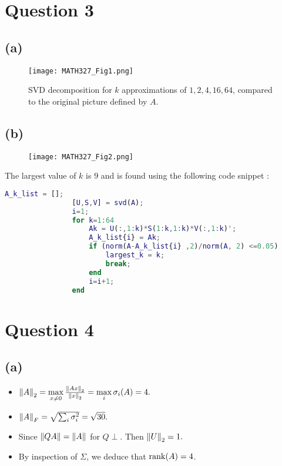 \documentclass[12pt]{article}
\begin{document}
	\section*{Question 3}
		\subsection*{(a)}
				\begin{figure}[H]
					\centering
					\texttt{[image: MATH327\_Fig1.png]}
					\captionsetup{margin=1cm}
					\caption{SVD decomposition for $k$ approximations of $1,2,4,16,64$, compared to the original picture defined by $A$.}
			\end{figure}
		\subsection*{(b)}
				\begin{figure}[H]
					\centering
					\texttt{[image: MATH327\_Fig2.png]}
					\captionsetup{margin=1cm}
					\caption{}
			\end{figure}
		The largest value of $k$ is $9$ and is found using the following code snippet : 
			\begin{lstlisting}[language=Matlab, xleftmargin=-15em, showstringspaces=true]
				A_k_list = [];
				[U,S,V] = svd(A);
				i=1;
				for k=1:64
					Ak = U(:,1:k)*S(1:k,1:k)*V(:,1:k)';
					A_k_list{i} = Ak;
					if (norm(A-A_k_list{i} ,2)/norm(A, 2) <=0.05)
						largest_k = k;
						break;
					end
					i=i+1;
				end
			\end{lstlisting}
	\section*{Question 4}
		\subsection*{(a)}	
			\begin{itemize}
				\item	$\norm{A}_2 = \max\limits_{x \neq 0} \frac{\norm{Ax}_2}{\norm{x}_2} = \max\limits_i  \sigma_{i}(A) = 4.$
				\item $\norm{A}_F = \sqrt{\sum_{i} \sigma_i^{2}}  = \sqrt{30}.$
				\item Since $\norm{QA} = \norm{A}$ for $Q \perp$. Then $\norm{U}_2 =1.$
				\item By inspection of  $\Sigma$, we deduce that $\rank(A) =4$. 
			\end{itemize}
\end{document}
